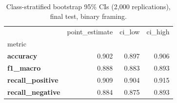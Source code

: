 \begin{table}
\caption{Class-stratified bootstrap 95\% CIs (2{,}000 replications), final test, binary framing.}
\label{tab:rq1_bootstrap_binary}
\begin{tabular}{lrrr}
\toprule
 & point_estimate & ci_low & ci_high \\
metric &  &  &  \\
\midrule
\textbf{accuracy} & 0.902 & 0.897 & 0.906 \\
\textbf{f1_macro} & 0.888 & 0.883 & 0.893 \\
\textbf{recall_positive} & 0.909 & 0.904 & 0.915 \\
\textbf{recall_negative} & 0.884 & 0.875 & 0.893 \\
\bottomrule
\end{tabular}
\end{table}
